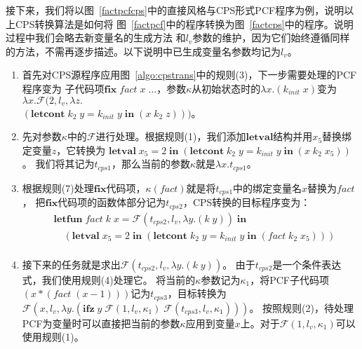 接下来，我们将以图~\ref{factpcfcps}中的直接风格与CPS形式PCF程序为例，说明以上CPS转换算法是如何将
图~\ref{factpcf}中的程序转换为图~\ref{factcps}中的程序。说明过程中我们会略去新变量名的生成方法
和$l_v$参数的维护，因为它们始终遵循同样的方法，不需再逐步描述。以下说明中已生成变量名参数均记为$l_v$。

\begin{enumerate}
    \item 首先对CPS源程序应用图~\ref{algo:cpstrans}中的规则(3)，下一步需要处理的PCF程序变为
        子代码项$\mathbf{fix}\; fact\; x\; \dots$，参数$\kappa $从初始状态时的$\lambda x. (k_{init}\; x)$变为
        $\lambda x. \mathbf{\mathcal{F}}(2, l_v, \lambda z. $ \\ $(\mathbf{letcont}\; k_2\; y=k_{init}\; y\; \mathbf{in}\; (x\; k_2\; z)))$。
    \item 先对参数$\kappa $中的$\mathbf{\mathcal{F}}$进行处理。根据规则(1)，我们添加$\mathbf{letval}$结构并用$x_5$替换绑定变量$z$，它转换为
        $\mathbf{letval}\; x_5 = 2\; \mathbf{in}\; (\mathbf{letcont}\; k_2\; y=k_{init}\; y\; \mathbf{in}\; (x\; k_2\; x_5))$。
        我们将其记为$t_{cps1}$，那么当前的参数$\kappa $就是$\lambda x. t_{cps1}$。
    \item 根据规则(7)处理$\mathbf{fix}$代码项，$\kappa(fact)$就是将$t_{cps1}$中的绑定变量名$x$替换为$fact$，
    把$\mathbf{fix}$代码项的函数体部分记为$t_{cps2}$，CPS转换的目标程序变为：
    \begin{equation}
        \nonumber
        \begin{aligned}
        & \mathbf{letfun}\; fact\; k\; x = \mathbf{\mathcal{F}}(t_{cps2}, l_v, \lambda y. (k\; y))\; \mathbf{in} \\
        & \quad (\mathbf{letval}\; x_5=2\; \mathbf{in}\; (\mathbf{letcont}\; k_2\; y=k_{init}\; y\; \mathbf{in}\; (fact\; k_2\; x_5))) \\
        \end{aligned}
    \end{equation}
    \item 接下来的任务就是求出$\mathbf{\mathcal{F}}(t_{cps2}, l_v, \lambda y. (k\; y))$。
        由于$t_{cps2}$是一个条件表达式，我们使用规则(4)处理它。
        将当前的$\kappa$参数记为$\kappa_1$，将PCF子代码项$(x*(fact\; (x-1)))$记为$t_{cps3}$，目标转换为
        $\mathbf{\mathcal{F}}(x, l_v, \lambda y. (\mathbf{ifz}\; y\; \mathbf{\mathcal{F}}(1, l_v, \kappa_1)\; \mathbf{\mathcal{F}}(t_{cps3}, l_v, \kappa_1)))$。
        按照规则(2)，待处理PCF为变量时可以直接把当前的参数$\kappa$应用到变量$x$上。对于$\mathbf{\mathcal{F}}(1, l_v, \kappa_1)$可以使用规则(1)。

\end{enumerate}

